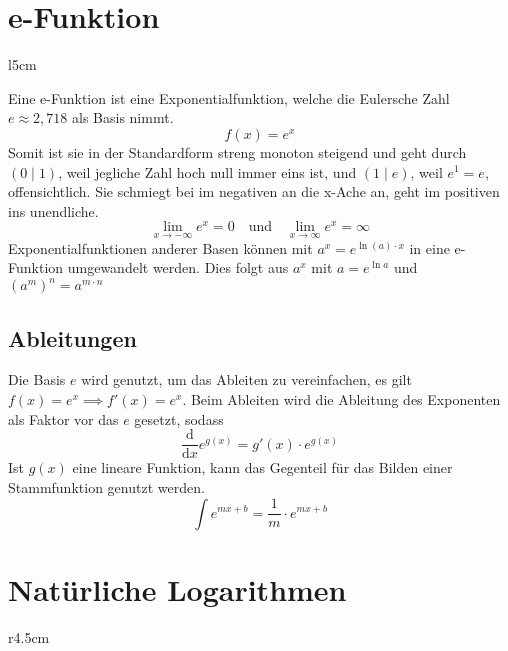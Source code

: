 \documentclass{article}
\begin{document}
 
\section{e-Funktion}
\begin{wrapfigure}{l}{5cm}
 \centering
\end{wrapfigure}  
Eine e-Funktion ist eine Exponentialfunktion, welche die Eulersche Zahl $e \approx 2,718$ als Basis nimmt.
\[
 f(x)=e^x
\]
Somit ist sie in der Standardform streng monoton steigend und geht durch ${(0 \mid 1)}$, weil jegliche Zahl hoch null immer eins ist, und $(1 \mid e)$, weil $e^1=e$, offensichtlich. \newline
Sie schmiegt bei im negativen an die x-Ache an, geht im positiven ins unendliche.
\[
 \lim_{x \to -\infty} e^x = 0
 \quad \text{und} \quad
 \lim_{x \to \infty} e^x = \infty
\]
Exponentialfunktionen anderer Basen können mit $a^x = e^{\ln{(a)} \cdot x}$ in eine e-Funktion umgewandelt werden. Dies folgt aus $a^x$ mit $a=e^{\ln{a}}$ und $(a^m)^n = a^{m \cdot n}$ 
\subsection{Ableitungen} 
Die Basis $e$ wird genutzt, um das Ableiten zu vereinfachen, es gilt $f(x)=e^x \implies f'(x)=e^x$. \newline
Beim Ableiten wird die Ableitung des Exponenten als Faktor vor das $e$ gesetzt, sodass 
\[
 \frac{\mathrm{d}}{\mathrm{d}x} e^{g(x)} = g'(x) \cdot e^{g(x)} 
\]
Ist $g(x)$ eine lineare Funktion, kann das Gegenteil für das Bilden einer Stammfunktion genutzt werden.
\[
 \int e^{mx+b} = \frac{1}{m} \cdot e^{mx+b}
\]
 
\section{Natürliche Logarithmen} 
\begin{wrapfigure}{r}{4.5cm}
 \centering
\end{wrapfigure}  
 
\end{document}
